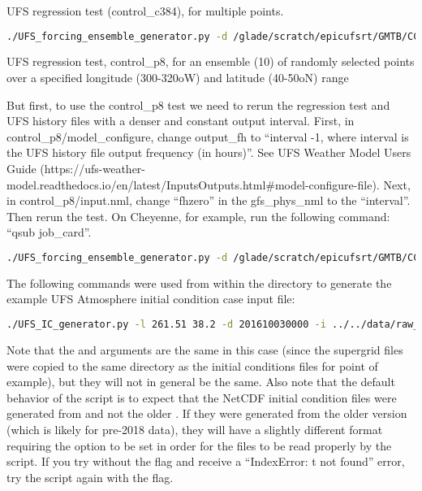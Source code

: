 UFS regression test (control_c384), for multiple points.
\begin{lstlisting}[language=bash]
./UFS_forcing_ensemble_generator.py -d /glade/scratch/epicufsrt/GMTB/CCPP-SCM/UFS_RTs/control_c384/ -sc --C_RES 384 -dt 225 -fhz 6 -n control_c384 -lons 300 300 300 300 -lats 34 35 35 37
\end{lstlisting}

UFS regression test, control_p8, for an ensemble (10) of randomly selected points over a specified longitude (300-320oW) and latitude (40-50oN) range

But first, to use the control_p8 test we need to rerun the regression test and UFS history files with a denser and constant output interval. First, in control_p8/model_configure, change output_fh to “interval -1, where interval is the UFS history file output frequency (in hours)”. See UFS Weather Model Users Guide (https://ufs-weather-model.readthedocs.io/en/latest/InputsOutputs.html#model-configure-file). Next, in control_p8/input.nml, change “fhzero” in the gfs_phys_nml to the “interval”. Then rerun the test. On Cheyenne, for example, run the following command: “qsub job_card”.
\begin{lstlisting}[language=bash]
./UFS_forcing_ensemble_generator.py -d /glade/scratch/epicufsrt/GMTB/CCPP-SCM/UFS_RTs/control_p8/ -sc --C_RES 96 -dt 720 -fhz 3 -n control_p8 -lonl 300 320 -latl 40 50 -nens 10
\end{lstlisting}



The following commands were used from within the  directory to generate the example UFS Atmosphere initial condition case input file:
\begin{lstlisting}[language=bash]
./UFS_IC_generator.py -l 261.51 38.2 -d 201610030000 -i ../../data/raw_case_input/FV3_C96_example_ICs -g ../../data/raw_case_input/FV3_C96_example_ICs -n fv3_model_point_noah -oc
\end{lstlisting}

Note that the  and  arguments are the same in this case (since the supergrid files were copied to the same directory as the initial conditions files for point of example), but they will not in general be the same. Also note that the default behavior of the script is to expect that the NetCDF initial condition files were generated from  and not the older . If they were generated from the older version (which is likely for pre-2018 data), they will have a slightly different format requiring the  option to be set in order for the files to be read properly by the script. If you try without the  flag and receive a ``IndexError: t not found'' error, try the script again with the flag.

